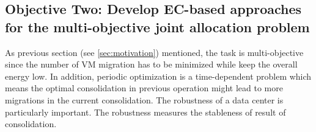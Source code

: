 \subsection{Objective Two: Develop EC-based approaches for the multi-objective joint allocation problem}

As previous section (see \ref{sec:motivation}) mentioned, the task is multi-objective since the number of VM migration has to be minimized while keep the overall energy low. In addition, periodic optimization is a time-dependent problem which means the optimal consolidation in previous operation might lead to more migrations in the current consolidation. The robustness of a data center is particularly important. The robustness measures the stableness of result of consolidation.


